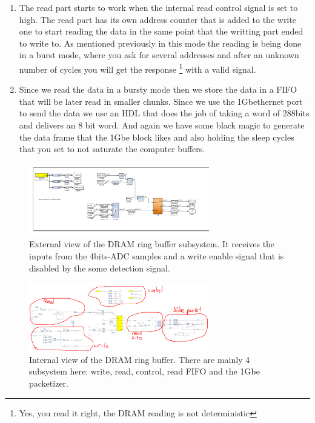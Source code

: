 \begin{enumerate}
\begin{enumerate}[label=(\alph*)]
        \item The read part starts to work when the internal read control signal is set to high. The read part has its own address counter that is added to the write one to start reading the data in the same point that the writting part ended to write to. As mentioned previously in this mode the reading is being done in a burst mode, where you ask for several addresses and after an unknown number of cycles you will get the response \footnote{Yes, you read it right, the DRAM reading is not deterministic} with a valid signal.
        \item Since we read the data in a bursty mode then we store the data in a FIFO that will be later read in smaller chunks. Since we use the 1Gbethernet port to send the data we use an HDL that does the job of taking a word of 288bits and delivers an 8 bit word. And again we have some black magic to generate the data frame that the 1Gbe block likes and also holding the sleep cycles that you set to not saturate the computer buffers.
    \end{enumerate}


    \begin{figure}
        \centering
        \includegraphics[width=0.7\textwidth]{images/dram_ring_buffer.png}
        \caption{External view of the DRAM ring buffer subsystem. It receives the inputs from the 4bits-ADC samples and a write enable signal that is disabled by the some detection signal.}
        \label{fig:dram_external}
    \end{figure}

    \begin{figure}
        \centering
        \includegraphics[width=0.7\textwidth]{images/dram_ring1.png}
        \caption{Internal view of the DRAM ring buffer. There are mainly 4 subsystem here: write, read, control, read FIFO and the 1Gbe packetizer.}
        \label{fig:dram_internal}
    \end{figure}


\end{enumerate}
